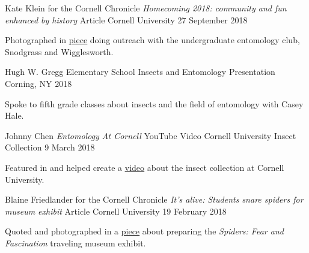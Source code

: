 \begin{cventries}
  \cventry
    {Kate Klein for the Cornell Chronicle} %
    {\emph{Homecoming 2018: community and fun enhanced by history} Article} %
    {Cornell University} %
    {27 September 2018} %
    {
      \begin{cvitems} %
        \item {Photographed in \href{https://news.cornell.edu/stories/2018/09/homecoming-2018-community-and-fun-enhanced-history}{\underline{piece}} doing outreach with the undergraduate entomology club, Snodgrass and Wigglesworth.}
      \end{cvitems}
    }

  \cventry
    {Hugh W. Gregg Elementary School} %
    {Insects and Entomology Presentation} %
    {Corning, NY} %
    {2018} %
    {
      \begin{cvitems} %
        \item {Spoke to fifth grade classes about insects and the field of entomology with Casey Hale.}
      \end{cvitems}
    }

  \cventry
    {Johnny Chen} %
    {\emph{Entomology At Cornell} YouTube Video} %
    {Cornell University Insect Collection} %
    {9 March 2018} %
    {
      \begin{cvitems} %
        \item {Featured in and helped create a \href{https://www.youtube.com/watch?v=SAqNvSO6Ulg}{\underline{video}} about the insect collection at Cornell University.}
      \end{cvitems}
    }

  \cventry
    {Blaine Friedlander for the Cornell Chronicle} %
    {\emph{It’s alive: Students snare spiders for museum exhibit} Article} %
    {Cornell University} %
    {19 February 2018} %
    {
      \begin{cvitems} %
        \item {Quoted and photographed in a \href{https://news.cornell.edu/stories/2018/02/its-alive-students-snare-spiders-museum-exhibit}{\underline{piece}} about preparing the \emph{Spiders: Fear and Fascination} traveling museum exhibit.}
      \end{cvitems}
    }


\end{cventries}
